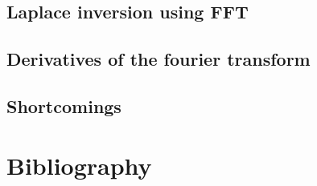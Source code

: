 \documentclass[12pt,a4paper,oneside,openright]{report} %
\begin{document}
\chapter{Laplace inversion using FFT}
\label{app:lapInv}


\chapter{Derivatives of the fourier transform}
\label{app:deriv_of_FT}


\chapter{Shortcomings}
\label{app:shortcomings}


%
%
%
%
%
%
%
%
%
%

\part{Bibliography}


\end{document}
